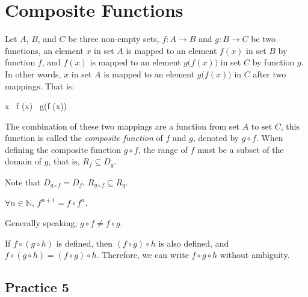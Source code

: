 \documentclass[12pt]{report}
\begin{document}
\newpage

\section{Composite Functions}

Let $A$, $B$, and $C$ be three non-empty sets, $f: A \to B$ and $g: B \to C$ be
two functions, an element $x$ in set $A$ is mapped to an element $f (x)$ in set
$B$ by function $f$, and $f (x)$ is mapped to an element $g\big(f (x)\big)$ in
set $C$ by function $g$. In other words, $x$ in set $A$ is mapped to an element
$g\big(f (x)\big)$ in $C$ after two mappings. That is:
\begin{cequation}
      x\  f (x)\  g\big(f (x)\big)
\end{cequation}

The combination of these two mappings are a function from set $A$ to set $C$,
this function is called the \emph{composite function} of $f$ and $g$, denoted
by $g \circ f$. When defining the composite function $g \circ f$, the range of
$f$ must be a subset of the domain of $g$, that is, $R_f \subseteq D_g$.

Note that $D_{g \circ f} = D_f$, $R_{g \circ f} \subseteq R_g$.

$\forall n \in \mathbb{N}$, $f^{n+1} = f \circ f^n$.

Generally speaking, $g \circ f \neq f \circ g$.

If $f \circ (g \circ h)$ is defined, then $(f \circ g) \circ h$ is also
defined, and $f \circ (g \circ h) = (f \circ g) \circ h$. Therefore, we can
write $f \circ g \circ h$ without ambiguity.

\subsection{Practice 5}
\end{document}
